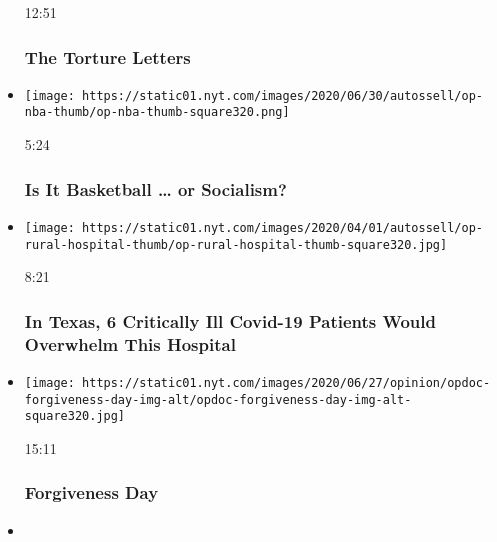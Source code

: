 \begin{itemize}
  12:51

  \hypertarget{the-torture-letters}{%
  \subsubsection{The Torture Letters}\label{the-torture-letters}}
\item
  \href{https://www.nytimes.com/video/opinion/100000007182805/income-inequality-nba-socialism.html?action=click\&module=video-series-bar\&region=header\&pgtype=Article\&playlistId=video/opinion}{}

  \texttt{[image: https://static01.nyt.com/images/2020/06/30/autossell/op-nba-thumb/op-nba-thumb-square320.png]}

  5:24

  \hypertarget{is-it-basketball--or-socialism}{%
  \subsubsection{Is It Basketball \ldots{} or
  Socialism?}\label{is-it-basketball--or-socialism}}
\item
  \href{https://www.nytimes.com/video/opinion/100000007105817/coronavirus-texas-hospital.html?action=click\&module=video-series-bar\&region=header\&pgtype=Article\&playlistId=video/opinion}{}

  \texttt{[image: https://static01.nyt.com/images/2020/04/01/autossell/op-rural-hospital-thumb/op-rural-hospital-thumb-square320.jpg]}

  8:21

  \hypertarget{in-texas-6-critically-ill-covid-19-patients-would-overwhelm-this-hospital}{%
  \subsubsection{In Texas, 6 Critically Ill Covid-19 Patients Would
  Overwhelm This
  Hospital}\label{in-texas-6-critically-ill-covid-19-patients-would-overwhelm-this-hospital}}
\item
  \href{https://www.nytimes.com/video/opinion/100000007172575/forgiveness-day.html?action=click\&module=video-series-bar\&region=header\&pgtype=Article\&playlistId=video/opinion}{}

  \texttt{[image: https://static01.nyt.com/images/2020/06/27/opinion/opdoc-forgiveness-day-img-alt/opdoc-forgiveness-day-img-alt-square320.jpg]}

  15:11

  \hypertarget{forgiveness-day}{%
  \subsubsection{Forgiveness Day}\label{forgiveness-day}}
\item
  \href{https://www.nytimes.com/video/opinion/100000007184142/coronavirus-pandemic-parenting.html?action=click\&module=video-series-bar\&region=header\&pgtype=Article\&playlistId=video/opinion}{}


\end{itemize}
